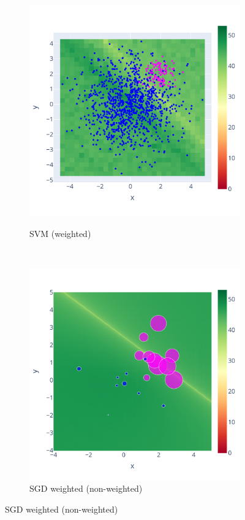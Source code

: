\documentclass[11pt]{article}
\begin{document}
\begin{figure}
\begin{subfigure}{.3\linewidth}
    \label{fig:SVM_nw_sig}
    \end{subfigure}
    \begin{subfigure}{.3\linewidth}
    \caption{SVM (weighted)}
    \includegraphics[width=\linewidth]{figure/SVM/weighted.pdf}
    \label{fig:SVM_w_sig}
    \end{subfigure} \\
    \begin{subfigure}{.3\linewidth}
    \caption{SGD weighted (non-weighted)}
    \includegraphics[width=\linewidth]{figure/Weighted/non_weighted.pdf}

\end{subfigure}
\end{figure}
\end{document}
